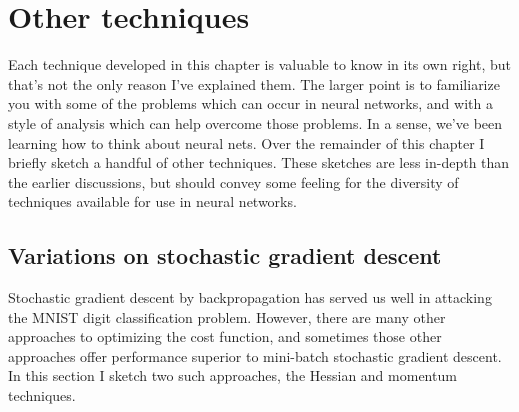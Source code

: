 \documentclass[a4paper,twoside,10pt]{book}
\begin{document}
\section{Other techniques}
Each technique developed in this chapter is valuable to know in its own right, but that's not the only reason I've explained them. The larger point is to familiarize you with some of the problems which can occur in neural networks, and with a style of analysis which can help overcome those problems. In a sense, we've been learning how to think about neural nets. Over the remainder of this chapter I briefly sketch a handful of other techniques. These sketches are less in-depth than the earlier discussions, but should convey some feeling for the diversity of techniques available for use in neural networks.

\subsection{Variations on stochastic gradient descent}
Stochastic gradient descent by backpropagation has served us well in attacking the MNIST digit classification problem. However, there are many other approaches to optimizing the cost function, and sometimes those other approaches offer performance superior to mini-batch stochastic gradient descent. In this section I sketch two such approaches, the Hessian and momentum techniques.
\end{document}
